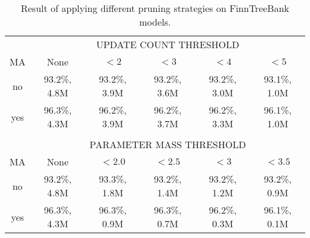 \begin{table}[htb!]
\begin{center}
\begin{tabular}{c|c|c|c|c|c}
\multicolumn{1}{c}{}        & \multicolumn{5}{c}{{\small\uppercase{Update Count Threshold}}}\\
\noalign{\smallskip}
\hline
MA                     & None           & $< 2$        & $< 3$        & $< 4$        & $< 5$       \\
\hline
no                     & 93.2\%, 4.8M   & 93.2\%, 3.9M & 93.2\%, 3.6M & 93.2\%, 3.0M & 93.1\%, 1.0M \\
yes                    & 96.3\%, 4.3M   & 96.2\%, 3.9M & 96.2\%, 3.7M & 96.2\%, 3.3M & 96.1\%, 1.0M \\
\multicolumn{6}{c}{ }\\%
\multicolumn{1}{c}{}                        & \multicolumn{5}{c}{{\small\uppercase{Parameter Mass Threshold}}}\\
\noalign{\smallskip}
\hline
MA                     & None         & $< 2.0$      & $< 2.5$      & $< 3$      & $< 3.5$        \\
\hline
no                     & 93.2\%, 4.8M & 93.3\%, 1.8M & 93.2\%, 1.4M & 93.2\%, 1.2M & 93.2\%, 0.9M \\
yes                    & 96.3\%, 4.3M & 96.3\%, 0.9M & 96.3\%, 0.7M & 96.2\%, 0.3M & 96.1\%, 0.1M \\
\end{tabular}
\caption{Result of applying different pruning strategies on FinnTreeBank models.}\label{tab:pruning-ftb}
\end{center}
\end{table}

